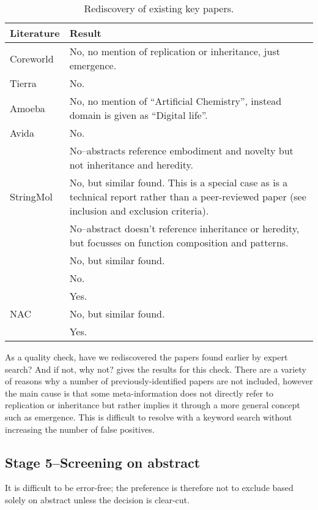 \begin{table*}
\footnotesize
\begin{center}
\begin{tabular}{@{}lp{6cm}@{}}
\toprule	
Literature & Result \\
\midrule
Coreworld \cite{Rasmussen1990} & No, no mention of replication or inheritance, just emergence.\\
Tierra \cite{Ray1991} & No.\\
Amoeba \cite{Pargellis2001} & No, no mention of ``Artificial Chemistry'', instead domain is given as ``Digital life''.\\
Avida \cite{Ofria2004} & No.\\
\cite{Nellis2012}\cite{Nellis2014} & No--abstracts reference embodiment and novelty but not inheritance and heredity.\\
StringMol \cite{Hickinbotham2012} & No, but similar found. This is a special case as  \cite{Hickinbotham2012} is a technical report rather than a peer-reviewed paper (see inclusion and exclusion criteria).\\
\cite{Fontana1992}	& No--abstract doesn't reference inheritance or heredity, but focusses on function composition and patterns.\\
\cite{Dittrich1998}	& No, but similar found.	\\
\cite{Nowostawski2005} & No.\\
\cite{Fenizio2000}\cite{Fenizio2001} & Yes.	\\		
NAC \cite{Suzuki2006}    & No, but similar found.\\
\cite{Gardiner2007}  & Yes.\\
\bottomrule
\end{tabular}
\end{center}
\caption{Rediscovery of existing key papers.}\label{map-existing}
\end{table*}

As a quality check, have we rediscovered the papers found earlier by expert search? And if not, why not?  gives the results for this check. There are a variety of reasons why a number of previously-identified papers are not included, however the main cause is that some meta-information does not directly refer to replication or inheritance but rather implies it through a more general concept such as emergence. This is difficult to resolve with a keyword search without increasing the number of false positives.

\subsection{Stage 5--Screening on abstract}
It is difficult to be error-free; the preference is therefore not to exclude based solely on abstract unless the decision is clear-cut.

